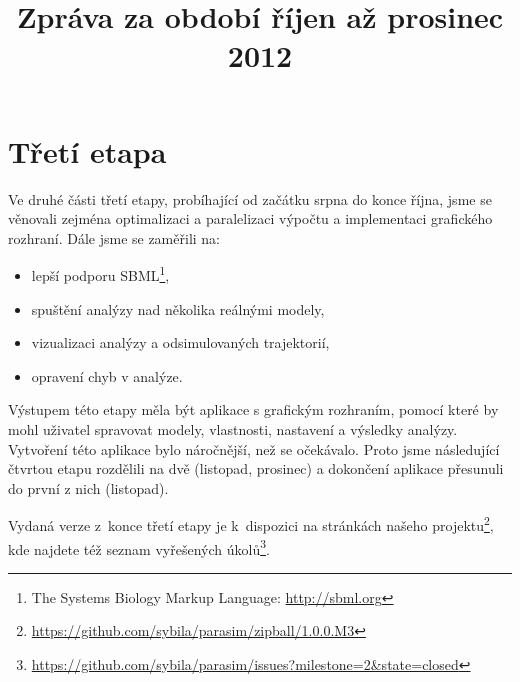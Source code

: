 \documentclass{parasim}
\title{Zpráva za období říjen až prosinec 2012}
\begin{document}
\section{Třetí etapa}

Ve druhé části třetí etapy, probíhající od začátku srpna do konce října, jsme se věnovali zejména
optimalizaci a paralelizaci výpočtu a implementaci grafického rozhraní. Dále jsme se zaměřili na:

\begin{itemize}
	\item	lepší podporu SBML\footnote{The Systems Biology Markup Language: \url{http://sbml.org}},
	\item	spuštění analýzy nad několika reálnými modely,
	\item	vizualizaci analýzy a odsimulovaných trajektorií,
	\item	opravení chyb v analýze.
\end{itemize}

Výstupem této etapy měla být aplikace s grafickým rozhraním, pomocí které by mohl uživatel spravovat modely,
vlastnosti, nastavení a výsledky analýzy. Vytvoření této aplikace bylo náročnější, než se očekávalo.
Proto jsme následující čtvrtou etapu rozdělili na dvě (listopad, prosinec) a dokončení aplikace přesunuli
do první z nich (listopad). 

Vydaná verze z~konce třetí etapy je k~dispozici na stránkách našeho projektu\footnote{\url{https://github.com/sybila/parasim/zipball/1.0.0.M3}},
kde najdete též seznam vyřešených úkolů\footnote{\url{https://github.com/sybila/parasim/issues?milestone=2&state=closed}}.
\end{document}
